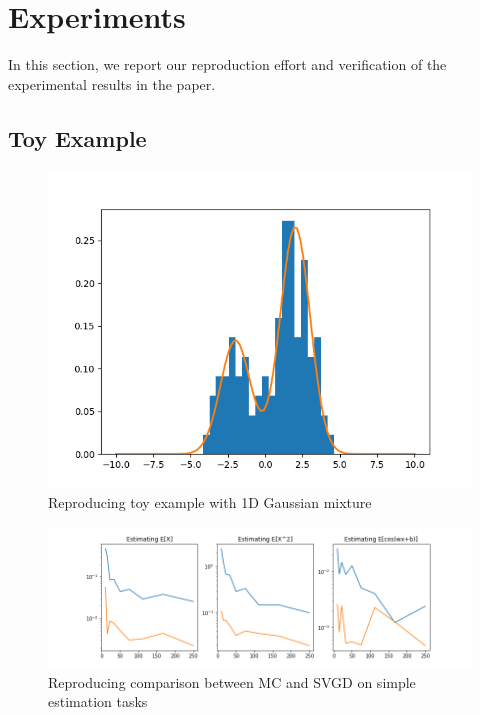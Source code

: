 \section{Experiments}
In this section, we report our reproduction effort and verification of the experimental results in the paper.

\subsection{Toy Example}


\begin{figure}[h]
    \centering
    \includegraphics[width=\textwidth]{original-code/Toy-Examples/mixture1d_iter_500.png}
    \caption{Reproducing toy example with 1D Gaussian mixture}
    \label{fig:my_label}
\end{figure}

\begin{figure}[h]
    \centering
    \includegraphics[width=\textwidth]{figs/toy-figure2.png}
    \caption{Reproducing comparison between MC and SVGD on simple estimation tasks}
    \label{fig:my_label}
\end{figure}

